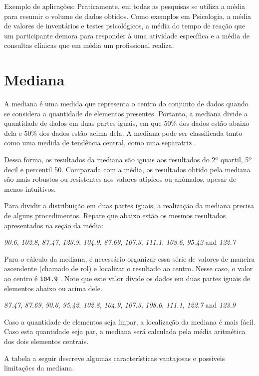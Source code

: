 \documentclass[
]{book}
\begin{document}
Exemplo de aplicações: Praticamente, em todas as pesquisas se utiliza a média para resumir o volume de dados obtidos. Como exemplos em Psicologia, a média de valores de inventários e testes psicológicos, a média do tempo de reação que um participante demora para responder à uma atividade específica e a média de consultas clínicas que em média um profissional realiza.

\hypertarget{mediana}{%
\section{Mediana}\label{mediana}}

A mediana é uma medida que representa o centro do conjunto de dados quando se considera a quantidade de elementos presentes. Portanto, a mediana divide a quantidade de dados em duas partes iguais, em que 50\% dos dados estão abaixo dela e 50\% dos dados estão acima dela. A mediana pode ser classificada tanto como uma medida de tendência central, como uma separatriz \citep{neto2010}.

Dessa forma, os resultados da mediana são iguais aos resultados do 2º quartil, 5º decil e percentil 50. Comparada com a média, os resultados obtido pela mediana são mais robustos ou resistentes aos valores atípicos ou anômalos, apesar de menos intuitivos.

Para dividir a distribuição em duas partes iguais, a realização da mediana precisa de alguns procedimentos. Repare que abaixo estão os mesmos resultados apresentados na seção da média:

\emph{90.6}, \emph{102.8}, \emph{87.47}, \emph{123.9}, \emph{104.9}, \emph{87.69}, \emph{107.3}, \emph{111.1}, \emph{108.6}, \emph{95.42} and \emph{122.7}

Para o cálculo da mediana, é necessário organizar essa série de valores de maneira ascendente (chamado de rol) e localizar o resultado ao centro. Nesse caso, o valor ao centro é \texttt{104.9} . Note que este valor divide os dados em duas partes iguais de elementos abaixo ou acima dele.

\emph{87.47}, \emph{87.69}, \emph{90.6}, \emph{95.42}, \emph{102.8}, \emph{104.9}, \emph{107.3}, \emph{108.6}, \emph{111.1}, \emph{122.7} and \emph{123.9}

Caso a quantidade de elementos seja ímpar, a localização da mediana é mais fácil. Caso esta quantidade seja par, a mediana será calculada pela média aritmética dos dois elementos centrais.

A tabela a seguir descreve algumas características vantajosas e possíveis limitações da mediana.
\end{document}
